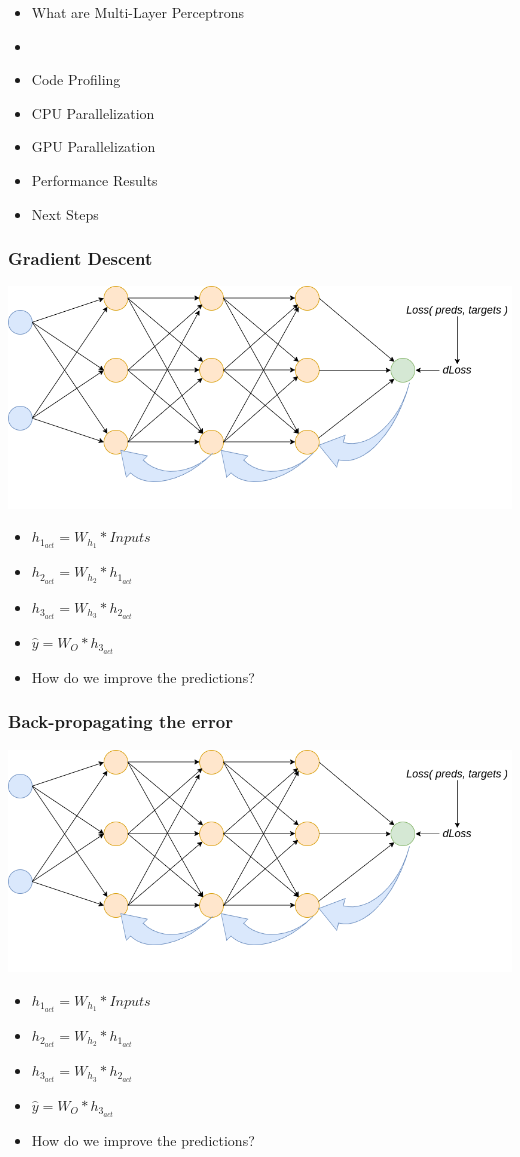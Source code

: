 \begin{frame}
\begin{itemize}
    \item What are Multi-Layer Perceptrons
    \item \textbf{\color{red}{Gradient Descent}}
    \item Code Profiling
    \item CPU Parallelization
    \item GPU Parallelization
    \item Performance Results 
    \item Next Steps
\end{itemize}
\end{frame}

\begin{frame}
    \frametitle{Gradient Descent}
    \center\includegraphics[width=.8\textwidth]{Images/backprop.png}
    \begin{itemize}
        \item $h_{1_{act}} = W_{h_1} * Inputs$
        \item $h_{2_{act}} = W_{h_2} * h_{1_{act}}$
        \item $h_{3_{act}} = W_{h_3} * h_{2_{act}}$
        \item $\hat{y} = W_{O} * h_{3_{act}}$
        \item How do we improve the predictions?
    \end{itemize}
\end{frame}

\begin{frame}
    \frametitle{Back-propagating the error}
    \center\includegraphics[width=.8\textwidth]{Images/backprop.png}
    \begin{itemize}
        \item $h_{1_{act}} = W_{h_1} * Inputs$
        \item $h_{2_{act}} = W_{h_2} * h_{1_{act}}$
        \item $h_{3_{act}} = W_{h_3} * h_{2_{act}}$
        \item $\hat{y} = W_{O} * h_{3_{act}}$
        \item How do we improve the predictions?
    \end{itemize}
\end{frame}

